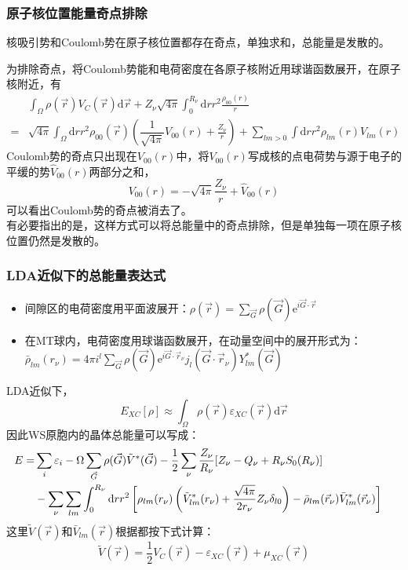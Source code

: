 \frame
{
\frametitle{原子核位置能量奇点排除}
核吸引势和\textrm{Coulomb}势在原子核位置都存在奇点，单独求和，总能量是发散的。

为排除奇点，将\textrm{Coulomb}势能和电荷密度在各原子核附近用球谐函数展开，在原子核附近，有
{\footnotesize\begin{displaymath}
  \begin{split}
    &\int_{\Omega}\rho(\vec r)V_C(\vec r)\mathrm{d}\vec r+Z_{\nu}\sqrt{4\pi}\int_0^{R_{\nu}}\mathrm{d}rr^2\frac{\rho_{00}(r)}r\\
    =&\sqrt{4\pi}\int_{\Omega}\mathrm{d}rr^2\rho_{00}(\vec r)\left(\dfrac1{\sqrt{4\pi}}V_{00}(r)+\frac{Z_{\nu}}r\right)+\sum_{lm>0}\int\mathrm{d}rr^2\rho_{lm}(r)V_{lm}(r)
  \end{split}
\end{displaymath}}
\textrm{Coulomb}势的奇点只出现在$V_{00}(r)$中，将$V_{00}(r)$写成核的点电荷势与源于电子的平缓的势$\hat V_{00}(r)$两部分之和，
\footnotesize{$$V_{00}(r)=-\sqrt{4\pi}\frac{Z_{\nu}}r+\hat V_{00}(r)$$}
可以看出\textrm{Coulomb}势的奇点被消去了。\\有必要指出的是，这样方式可以将总能量中的奇点排除，但是单独每一项在原子核位置仍然是发散的。
}
\frame
{
\frametitle{LDA近似下的总能量表达式}
\begin{itemize}
	\item 间隙区的电荷密度用平面波展开：\footnotesize{$\rho(\vec r)=\sum\limits_{\vec G}\rho(\vec G)\mathrm{e}^{i\vec G\cdot\vec r}$}
	\item 在\textrm{MT}球内，电荷密度用球谐函数展开，在动量空间中的展开形式为：\footnotesize{$\bar\rho_{lm}(r_{\nu})=4\pi i^l\sum\limits_{\vec G}\rho(\vec G)\mathrm{e}^{i\vec G\cdot\vec r_{\nu}}j_l(\vec G\cdot\vec r_{\nu})Y_{lm}^{\ast}(\vec G)$}
\end{itemize}
\textrm{LDA}近似下，\footnotesize{$$E_{XC}[\rho]\approx\int_{\Omega}\rho(\vec r)\varepsilon_{XC}(\vec r)\textrm{d}\vec r$$}
因此\textrm{WS}原胞内的晶体总能量可以写成：
{\footnotesize
\begin{displaymath}
  \begin{split}
\hskip -10pt	  E=&\sum_i\varepsilon_i-\Omega\sum_{\vec G}\rho(\vec G)\tilde V^{\ast}(\vec G)-\frac12\sum_{\nu}\dfrac{Z_{\nu}}{R_{\nu}}[Z_{\nu}-Q_{\nu}+R_{\nu}S_0(R_{\nu})]\\
    &-\sum_{\nu}\sum_{lm}\int_0^{R_{\nu}}\mathrm{d}rr^2\left[\rho_{lm}(r_{\nu})\left(\tilde V_{lm}^{\ast}(r_{\nu})+\dfrac{\sqrt{4\pi}}{2r_{\nu}}Z_{\nu}\delta_{l0}\right)-\bar\rho_{lm}(\vec r_{\nu})\bar V_{lm}^{\ast}(\vec r_{\nu})\right]
  \end{split}
  \label{eq:solid-83}
\end{displaymath}}
这里$\tilde V(\vec r)$和$\bar V_{lm}(\vec r)$根据都按下式计算：
\footnotesize{$$\tilde V(\vec r)=\frac12V_C(\vec r)-\varepsilon_{XC}(\vec r)+\mu_{XC}(\vec r)$$}
}

